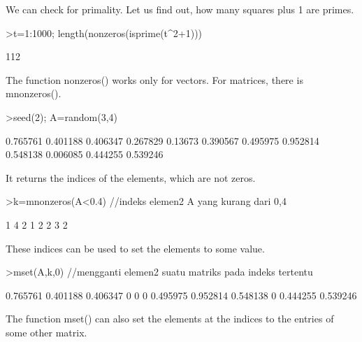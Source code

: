 \documentclass{article}
\begin{document}
\begin{eulernotebook}
\begin{eulercomment}
\begin{eulercomment}
\begin{eulercomment}
\begin{eulercomment}
\begin{eulercomment}
We can check for primality. Let us find out, how many squares plus 1
are primes.
\end{eulercomment}
\begin{eulerprompt}
>t=1:1000; length(nonzeros(isprime(t^2+1)))
\end{eulerprompt}
\begin{euleroutput}
  112
\end{euleroutput}
\begin{eulercomment}
The function nonzeros() works only for vectors. For matrices, there is
mnonzeros().
\end{eulercomment}
\begin{eulerprompt}
>seed(2); A=random(3,4)
\end{eulerprompt}
\begin{euleroutput}
       0.765761      0.401188      0.406347      0.267829 
        0.13673      0.390567      0.495975      0.952814 
       0.548138      0.006085      0.444255      0.539246 
\end{euleroutput}
\begin{eulercomment}
It returns the indices of the elements, which are not zeros.
\end{eulercomment}
\begin{eulerprompt}
>k=mnonzeros(A<0.4) //indeks elemen2 A yang kurang dari 0,4
\end{eulerprompt}
\begin{euleroutput}
              1             4 
              2             1 
              2             2 
              3             2 
\end{euleroutput}
\begin{eulercomment}
These indices can be used to set the elements to some value.
\end{eulercomment}
\begin{eulerprompt}
>mset(A,k,0) //mengganti elemen2 suatu matriks pada indeks tertentu
\end{eulerprompt}
\begin{euleroutput}
       0.765761      0.401188      0.406347             0 
              0             0      0.495975      0.952814 
       0.548138             0      0.444255      0.539246 
\end{euleroutput}
\begin{eulercomment}
The function mset() can also set the elements at the indices to the
entries of some other matrix.
\end{eulercomment}
\begin{eulerprompt}

\end{eulerprompt}
\end{eulercomment}
\end{eulercomment}
\end{eulercomment}
\end{eulercomment}
\end{eulernotebook}
\end{document}
